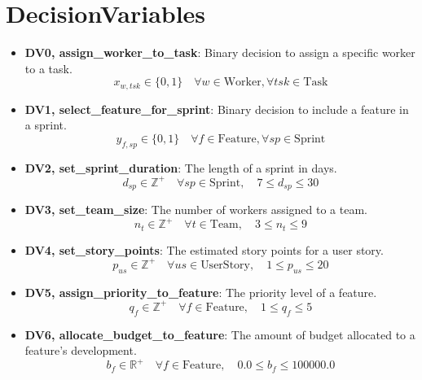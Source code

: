 \documentclass[11pt]{article}
\begin{document}
\section{DecisionVariables}
\begin{itemize}
    \item \textbf{DV0, assign\_worker\_to\_task}: Binary decision to assign a specific worker to a task.
        \[ x_{w, tsk} \in \{0, 1\} \quad \forall w \in \text{Worker}, \forall tsk \in \text{Task} \]
    \item \textbf{DV1, select\_feature\_for\_sprint}: Binary decision to include a feature in a sprint.
        \[ y_{f, sp} \in \{0, 1\} \quad \forall f \in \text{Feature}, \forall sp \in \text{Sprint} \]
    \item \textbf{DV2, set\_sprint\_duration}: The length of a sprint in days.
        \[ d_{sp} \in \mathbb{Z}^+ \quad \forall sp \in \text{Sprint}, \quad 7 \leq d_{sp} \leq 30 \]
    \item \textbf{DV3, set\_team\_size}: The number of workers assigned to a team.
        \[ n_t \in \mathbb{Z}^+ \quad \forall t \in \text{Team}, \quad 3 \leq n_t \leq 9 \]
    \item \textbf{DV4, set\_story\_points}: The estimated story points for a user story.
        \[ p_{us} \in \mathbb{Z}^+ \quad \forall us \in \text{UserStory}, \quad 1 \leq p_{us} \leq 20 \]
    \item \textbf{DV5, assign\_priority\_to\_feature}: The priority level of a feature.
        \[ q_f \in \mathbb{Z}^+ \quad \forall f \in \text{Feature}, \quad 1 \leq q_f \leq 5 \]
    \item \textbf{DV6, allocate\_budget\_to\_feature}: The amount of budget allocated to a feature's development.
        \[ b_f \in \mathbb{R}^+ \quad \forall f \in \text{Feature}, \quad 0.0 \leq b_f \leq 100000.0 \]
\end{itemize}
\end{document}
